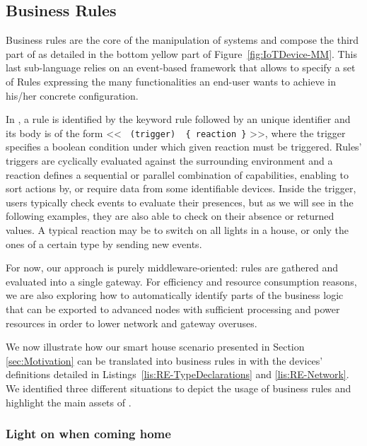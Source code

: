 \subsection{Business Rules}
\label{sec:IoTDSL-BusinessRules}

Business rules are the core of the manipulation of \IOT systems and compose the third part of \IOTDSL as detailed in the bottom yellow part of Figure~\ref{fig:IoTDevice-MM}. This last sub-language relies on an event-based framework that allows to specify a set of \textsf{Rule}s expressing the many functionalities an end-user wants to achieve in his/her concrete configuration. 

In \IOTDSL, a rule is identified by the keyword \textsf{rule} followed by an unique identifier and its body is of the form << \texttt{\textbf{\color{codeviolet}{when}} (trigger) \textbf{\color{codeviolet}{do}} \{ reaction \}} >>, where the \textsf{trigger} specifies a boolean condition under which given \textsf{reaction} must be triggered. Rules' \textsf{trigger}s are cyclically evaluated against the surrounding environment and a \textsf{reaction} defines a sequential or parallel combination of capabilities, enabling to sort actions by, or require data from some identifiable devices. Inside the \textsf{trigger}, users typically check events to evaluate their presences, but as we will see in the following examples, they are also able to check on their absence or returned values. A typical \textsf{reaction} may be to switch on all lights in a house, or only the ones of a certain type by sending new events.

For now, our approach is purely middleware-oriented: rules are gathered and evaluated into a single gateway. For efficiency and resource consumption reasons, we are also exploring how to automatically identify parts of the business logic that can be exported to advanced nodes with sufficient processing and power resources in order to lower network and gateway overuses.

We now illustrate how our smart house scenario presented in Section \ref{sec:Motivation} can be translated into business rules in \IOTDSL with the devices' definitions detailed in Listings~\ref{lis:RE-TypeDeclarations} and \ref{lis:RE-Network}. We identified three different situations to depict the usage of business rules and highlight the main assets of \IOTDSL.

\subsubsection*{Light on when coming home}

